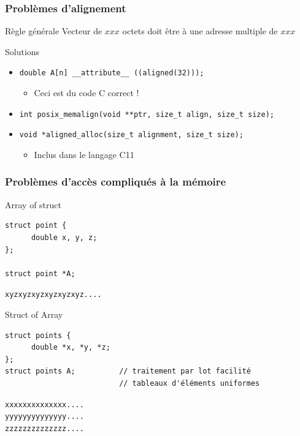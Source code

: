 \documentclass[xcolor={x11names,svgnames}]{beamer}
\begin{document}
\begin{frame}[fragile=singleslide]
  \frametitle{Problèmes d'alignement}

  \begin{alertblock}{Règle générale}
    Vecteur de $xxx$ octets doit être à une adresse multiple de $xxx$
  \end{alertblock}

  \bigskip
  
  \begin{exampleblock}{Solutions}
    \begin{itemize}
    \item \texttt{double A[n] __attribute__ ((aligned(32)));}
      \begin{itemize}
      \item Ceci est du code C correct !
      \end{itemize}
  \item \texttt{int posix_memalign(void **ptr, size_t align, size_t size);}
  \item \texttt{void *aligned_alloc(size_t alignment, size_t size);}
      \begin{itemize}
      \item Inclus dans le langage C11
      \end{itemize}
  \end{itemize}
\end{exampleblock}
\end{frame}


\begin{frame}[fragile=singleslide]
  \frametitle{Problèmes d'accès compliqués à la mémoire}

\begin{alertblock}{Array of struct}
  \begin{verbatim}
struct point {
      double x, y, z;
};

struct point *A;
  \end{verbatim}

\texttt{xyzxyzxyzxyzxyzxyz....}
\end{alertblock}

\begin{exampleblock}{Struct of Array}
  \begin{verbatim}
struct points {
      double *x, *y, *z;
};
struct points A;          // traitement par lot facilité
                          // tableaux d'éléments uniformes
  \end{verbatim}

  \texttt{xxxxxxxxxxxxxx....}\\
    \texttt{yyyyyyyyyyyyyy....}\\
    \texttt{zzzzzzzzzzzzzz....}\\
\end{exampleblock}

\end{frame}
\end{document}
